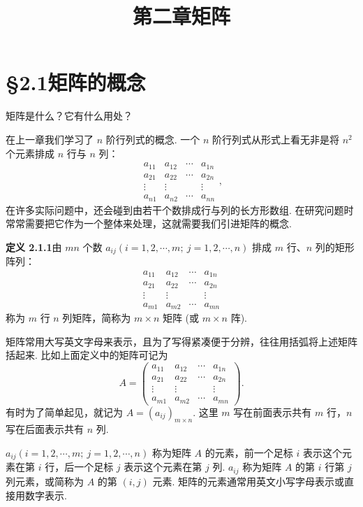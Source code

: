 \documentclass[UTF8,12pt,a4paper,fontset=fandol]{ctexart}
\title{第二章\quad 矩阵}
\author{}
\date{}
\begin{document}
\maketitle

\section*{§2.1\quad 矩阵的概念}

矩阵是什么？它有什么用处？

在上一章我们学习了 $n$ 阶行列式的概念. 一个 $n$ 阶行列式从形式上看无非是将 $n^2$ 个元素排成 $n$ 行与 $n$ 列：
\[
\begin{array}{cccc}
a_{11} & a_{12} & \cdots & a_{1n}\\
a_{21} & a_{22} & \cdots & a_{2n}\\
\vdots & \vdots & & \vdots\\
a_{n1} & a_{n2} & \cdots & a_{nn}
\end{array},
\]
在许多实际问题中，还会碰到由若干个数排成行与列的长方形数组. 在研究问题时常常需要把它作为一个整体来处理，这就需要我们引进矩阵的概念.

\noindent\textbf{定义 2.1.1}\quad 由 $mn$ 个数 $a_{ij}(i=1,2,\cdots,m;\ j=1,2,\cdots,n)$ 排成 $m$ 行、$n$ 列的矩形阵列：
\[
\begin{array}{cccc}
a_{11} & a_{12} & \cdots & a_{1n}\\
a_{21} & a_{22} & \cdots & a_{2n}\\
\vdots & \vdots & & \vdots\\
a_{m1} & a_{m2} & \cdots & a_{mn}
\end{array}
\]
称为 $m$ 行 $n$ 列矩阵，简称为 $m\times n$ 矩阵 (或 $m\times n$ 阵).

矩阵常用大写英文字母来表示，且为了写得紧凑便于分辨，往往用括弧将上述矩阵括起来. 比如上面定义中的矩阵可记为
\[
A=
\left(\begin{array}{cccc}
a_{11} & a_{12} & \cdots & a_{1n}\\
a_{21} & a_{22} & \cdots & a_{2n}\\
\vdots & \vdots & & \vdots\\
a_{m1} & a_{m2} & \cdots & a_{mn}
\end{array}\right).
\]
有时为了简单起见，就记为 $A=(a_{ij})_{m\times n}$. 这里 $m$ 写在前面表示共有 $m$ 行，$n$ 写在后面表示共有 $n$ 列.

$a_{ij}(i=1,2,\cdots,m;\ j=1,2,\cdots,n)$ 称为矩阵 $A$ 的元素，前一个足标 $i$ 表示这个元素在第 $i$ 行，后一个足标 $j$ 表示这个元素在第 $j$ 列. $a_{ij}$ 称为矩阵 $A$ 的第 $i$ 行第 $j$ 列元素，或简称为 $A$ 的第 $(i,j)$ 元素. 矩阵的元素通常用英文小写字母表示或直接用数字表示.
\end{document}

